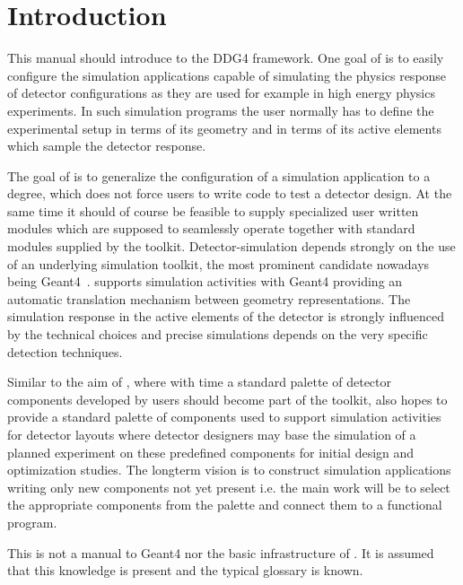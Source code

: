 
\section{Introduction}
\label{sec:ddg4-user-manual-introduction}
\noindent
This manual should introduce to the DDG4 framework. 
One goal of \DDG is to easily configure the simulation applications
capable of simulating the physics response of detector configurations 
as they are used for example in high energy physics experiments.
In such simulation programs the user normally has to define the 
experimental setup in terms of its geometry and in terms of its 
active elements which sample the detector response.

\noindent
The goal of \DDG is to generalize the configuration of a simulation
application to a degree, which does not force users to write code
to test a detector design. At the same time it should of course
be feasible to supply specialized user written modules which are supposed
to seamlessly operate together with standard modules supplied by the toolkit.
Detector-simulation depends strongly on the use of an underlying simulation
toolkit, the most prominent candidate nowadays being Geant4~\cite{bib:geant4}.
\DDhep supports simulation activities with Geant4 providing
an automatic translation mechanism between geometry representations.
The simulation response in the active elements of the detector
is strongly influenced by the technical 
choices and precise simulations depends on the very specific detection techniques.

\noindent
Similar to the aim of \DDhep\cite{bib:dd4hep}, 
where with time a standard palette of detector
components developed by users should become part of the toolkit,
\DDG also hopes to provide a standard palette of components used
to support simulation activities for detector layouts
where detector designers may base the simulation of a planned experiment 
on these predefined components for initial design and optimization 
studies. The longterm vision is to construct simulation applications
writing only new components not yet present i.e. the main work will be to
select the appropriate components from the palette and connect them
to a functional program.

\noindent
This is not a manual to Geant4 nor the basic infrastructure of \DDhep.
It is assumed that this knowledge is present and the typical glossary 
is known.

